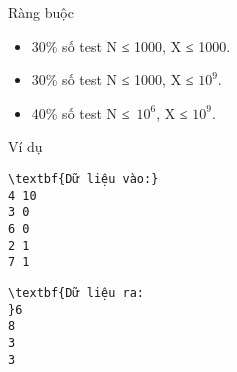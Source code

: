 Ràng buộc
\begin{itemize}
	\item 30\% số test N ≤ 1000, X ≤ 1000.
	\item 30\% số test N ≤ 1000, X ≤ $10^{9}$.
	\item 40\% số test N ≤ $10^{6}$, X ≤ $10^{9}$.
\end{itemize}
Ví dụ
\begin{verbatim}
\textbf{Dữ liệu vào:}
4 10
3 0
6 0
2 1
7 1\end{verbatim}
\begin{verbatim}
\textbf{Dữ liệu ra:
}6
8
3
3\end{verbatim}

 